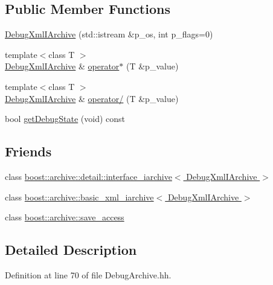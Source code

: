 \subsection*{Public Member Functions}
\begin{DoxyCompactItemize}
\item 
\hyperlink{classxtd_1_1serializer_1_1DebugXmlIArchive_a877cd247551b625bec79846a8b9274d1}{Debug\+Xml\+I\+Archive} (std\+::istream \&p\+\_\+os, int p\+\_\+flags=0)
\item 
{\footnotesize template$<$class T $>$ }\\\hyperlink{classxtd_1_1serializer_1_1DebugXmlIArchive}{Debug\+Xml\+I\+Archive} \& \hyperlink{classxtd_1_1serializer_1_1DebugXmlIArchive_a40060fc623b46cb0332a7ea56b1d9148}{operator$\ast$} (T \&p\+\_\+value)
\item 
{\footnotesize template$<$class T $>$ }\\\hyperlink{classxtd_1_1serializer_1_1DebugXmlIArchive}{Debug\+Xml\+I\+Archive} \& \hyperlink{classxtd_1_1serializer_1_1DebugXmlIArchive_a523764ab4e37ba9cb07dc7d7269ca507}{operator/} (T \&p\+\_\+value)
\item 
bool \hyperlink{classxtd_1_1serializer_1_1DebugXmlIArchive_a40860da9e1a849931364d86b56557357}{get\+Debug\+State} (void) const 
\end{DoxyCompactItemize}
\subsection*{Friends}
\begin{DoxyCompactItemize}
\item 
class \hyperlink{classxtd_1_1serializer_1_1DebugXmlIArchive_a54f75e33da74496cd06e608f4bec85dc}{boost\+::archive\+::detail\+::interface\+\_\+iarchive$<$ Debug\+Xml\+I\+Archive $>$}
\item 
class \hyperlink{classxtd_1_1serializer_1_1DebugXmlIArchive_a54affbd4684171cc9e5cabf2db73ffe5}{boost\+::archive\+::basic\+\_\+xml\+\_\+iarchive$<$ Debug\+Xml\+I\+Archive $>$}
\item 
class \hyperlink{classxtd_1_1serializer_1_1DebugXmlIArchive_aaca003bb8a4fc59424e4025130da4edd}{boost\+::archive\+::save\+\_\+access}
\end{DoxyCompactItemize}


\subsection{Detailed Description}


Definition at line 70 of file Debug\+Archive.\+hh.




